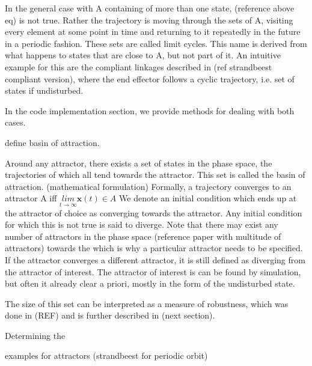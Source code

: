     In the general case with A containing of more than one state, (reference above eq) is not true. Rather the trajectory is moving through the sets of A, visiting every element at some point in time and returning to it repeatedly in the future in a periodic fashion. These sets are called limit cycles. This name is derived from what happens to states that are close to A, but not part of it. An intuitive example for this are the compliant linkages described in (ref strandbeest compliant version), where the end effector follows a cyclic trajectory, i.e. set of states if undisturbed. 

    In the code implementation section, we provide methods for dealing with both cases. 

    define basin of attraction. 

    Around any attractor, there exists a set of states in the phase space, the trajectories of which all tend towards the attractor. This set is called the basin of attraction. (mathematical formulation)
    Formally, a trajectory converges to an attractor A iff $\underset{t \rightarrow \infty}{lim}\mathbf{x}(t) \in A$
    We denote an initial condition which ends up at the attractor of choice as converging towards the attractor. Any initial condition for which this is not true is said to diverge. Note that there may exist any number of attractors in the phase space (reference paper with multitude of attractors) towards the  which is why a particular attractor needs to be specified. If the attractor converges a different attractor, it is still defined as diverging from the attractor of interest.  
    The attractor of interest is can be found by simulation, but often it already clear a priori, mostly in the form of the undisturbed state. 

    The size of this set can be interpreted as a measure of robustness, which was done in (REF) and is further described in (next section).

    Determining the 



    examples for attractors (strandbeest for periodic orbit) 




